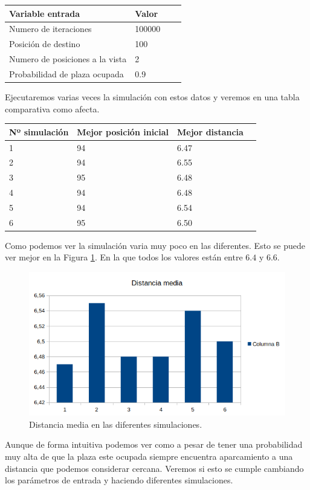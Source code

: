 \documentclass[12pt,a4paper]{article}
\begin{document}
\begin{table}[H]
	\centering
	\begin{tabular}{|l|l|l|l|}
		\hline
		\textbf{Variable entrada} & \textbf{Valor}\\ \hline
		Numero de iteraciones&100000\\ \hline
		Posición de destino&100\\ \hline
		Numero de posiciones a la vista&2\\ \hline
		Probabilidad de plaza ocupada&0.9\\ \hline
	\end{tabular}
\end{table}
Ejecutaremos varias veces la simulación con estos datos y veremos en una tabla comparativa como afecta. 
\begin{table}[H]
	\centering
	\begin{tabular}{|l|l|l|l|}
		\hline
		\textbf{Nº simulación} & \textbf{Mejor posición inicial}&\textbf{Mejor distancia}\\ \hline
		1&94&6.47\\\hline
		2&94&6.55\\\hline
		3&95&6.48\\\hline
		4&94&6.48\\\hline
		5&94&6.54\\\hline
		6&95&6.50\\\hline
	\end{tabular}

\end{table}
Como podemos ver la simulación varia muy poco en las diferentes. Esto se puede ver mejor en la Figura \ref{fig:mediadistancia}. En la que todos los valores están entre $6.4$ y $6.6$.
\begin{figure}[H]
	\centering
	\includegraphics{images/mediaDistancia}
	\caption{Distancia media en las diferentes simulaciones.}
	\label{fig:mediadistancia}
\end{figure}
Aunque de forma intuitiva podemos ver como a pesar de tener una probabilidad muy alta de que la plaza este ocupada siempre encuentra aparcamiento a una distancia que podemos considerar cercana. Veremos si esto se cumple cambiando los parámetros de entrada y haciendo diferentes simulaciones.
\end{document}
